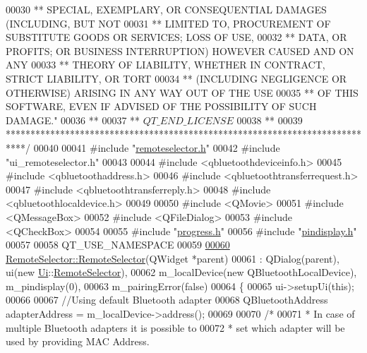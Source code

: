 \begin{DoxyCode}
00030 \textcolor{comment}{** SPECIAL, EXEMPLARY, OR CONSEQUENTIAL DAMAGES (INCLUDING, BUT NOT}
00031 \textcolor{comment}{** LIMITED TO, PROCUREMENT OF SUBSTITUTE GOODS OR SERVICES; LOSS OF USE,}
00032 \textcolor{comment}{** DATA, OR PROFITS; OR BUSINESS INTERRUPTION) HOWEVER CAUSED AND ON ANY}
00033 \textcolor{comment}{** THEORY OF LIABILITY, WHETHER IN CONTRACT, STRICT LIABILITY, OR TORT}
00034 \textcolor{comment}{** (INCLUDING NEGLIGENCE OR OTHERWISE) ARISING IN ANY WAY OUT OF THE USE}
00035 \textcolor{comment}{** OF THIS SOFTWARE, EVEN IF ADVISED OF THE POSSIBILITY OF SUCH DAMAGE."}
00036 \textcolor{comment}{**}
00037 \textcolor{comment}{** $QT\_END\_LICENSE$}
00038 \textcolor{comment}{**}
00039 \textcolor{comment}{****************************************************************************/}
00040 
00041 \textcolor{preprocessor}{#include "\hyperlink{remoteselector_8h}{remoteselector.h}"}
00042 \textcolor{preprocessor}{#include "ui\_remoteselector.h"}
00043 
00044 \textcolor{preprocessor}{#include <qbluetoothdeviceinfo.h>}
00045 \textcolor{preprocessor}{#include <qbluetoothaddress.h>}
00046 \textcolor{preprocessor}{#include <qbluetoothtransferrequest.h>}
00047 \textcolor{preprocessor}{#include <qbluetoothtransferreply.h>}
00048 \textcolor{preprocessor}{#include <qbluetoothlocaldevice.h>}
00049 
00050 \textcolor{preprocessor}{#include <QMovie>}
00051 \textcolor{preprocessor}{#include <QMessageBox>}
00052 \textcolor{preprocessor}{#include <QFileDialog>}
00053 \textcolor{preprocessor}{#include <QCheckBox>}
00054 
00055 \textcolor{preprocessor}{#include "\hyperlink{progress_8h}{progress.h}"}
00056 \textcolor{preprocessor}{#include "\hyperlink{pindisplay_8h}{pindisplay.h}"}
00057 
00058 QT\_USE\_NAMESPACE
00059 
\hypertarget{remoteselector_8cpp_source.tex_l00060}{}\hyperlink{classRemoteSelector_afd501861aba4f67aee79d24c40c9944c}{00060} \hyperlink{classRemoteSelector_afd501861aba4f67aee79d24c40c9944c}{RemoteSelector::RemoteSelector}(QWidget *parent)
00061 :   QDialog(parent), ui(new \hyperlink{namespaceUi}{Ui}::\hyperlink{classRemoteSelector}{RemoteSelector}),
00062     m\_localDevice(new QBluetoothLocalDevice), m\_pindisplay(0),
00063     m\_pairingError(false)
00064 \{
00065     ui->setupUi(\textcolor{keyword}{this});
00066 
00067     \textcolor{comment}{//Using default Bluetooth adapter}
00068     QBluetoothAddress adapterAddress = m\_localDevice->address();
00069 
00070     \textcolor{comment}{/*}
00071 \textcolor{comment}{     * In case of multiple Bluetooth adapters it is possible to}
00072 \textcolor{comment}{     * set which adapter will be used by providing MAC Address.}

\end{DoxyCode}
